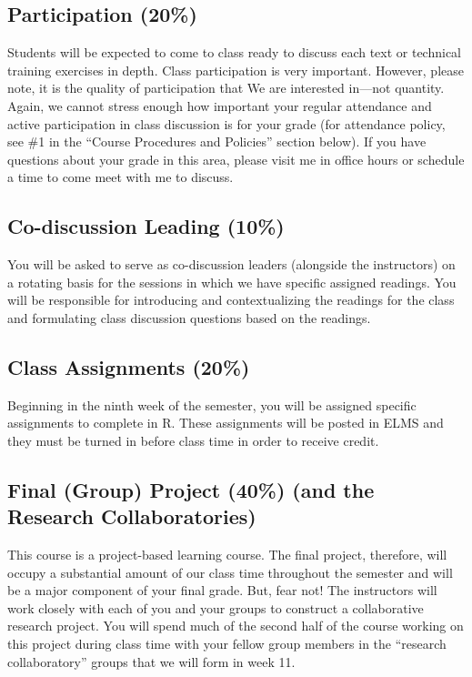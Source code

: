 \documentclass[
]{book}
\begin{document}
\hypertarget{participation-20}{%
\subsection{Participation (20\%)}\label{participation-20}}

Students will be expected to come to class ready to discuss each text or technical training exercises in depth. Class participation is very important. However, please note, it is the quality of participation that We are interested in---not quantity. Again, we cannot stress enough how important your regular attendance and active participation in class discussion is for your grade (for attendance policy, see \#1 in the ``Course Procedures and Policies'' section below). If you have questions about your grade in this area, please visit me in office hours or schedule a time to come meet with me to discuss.

\hypertarget{co-discussion-leading-10}{%
\subsection{Co-discussion Leading (10\%)}\label{co-discussion-leading-10}}

You will be asked to serve as co-discussion leaders (alongside the instructors) on a rotating basis for the sessions in which we have specific assigned readings. You will be responsible for introducing and contextualizing the readings for the class and formulating class discussion questions based on the readings.

\hypertarget{class-assignments-20}{%
\subsection{Class Assignments (20\%)}\label{class-assignments-20}}

Beginning in the ninth week of the semester, you will be assigned specific assignments to complete in R. These assignments will be posted in ELMS and they must be turned in before class time in order to receive credit.

\hypertarget{final-group-project-40-and-the-research-collaboratories}{%
\subsection{Final (Group) Project (40\%) (and the Research Collaboratories)}\label{final-group-project-40-and-the-research-collaboratories}}

This course is a project-based learning course. The final project, therefore, will occupy a substantial amount of our class time throughout the semester and will be a major component of your final grade. But, fear not! The instructors will work closely with each of you and your groups to construct a collaborative research project. You will spend much of the second half of the course working on this project during class time with your fellow group members in the ``research collaboratory'' groups that we will form in week 11.
\end{document}
